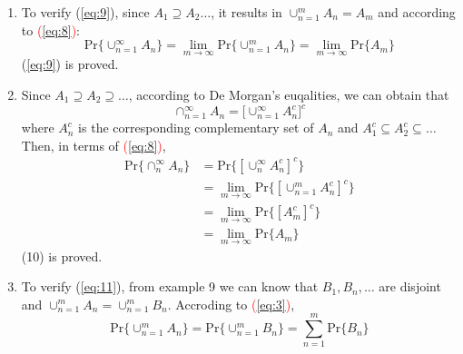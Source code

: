 \documentclass[UTF8]{article}
\begin{document}
\begin{enumerate}[1.]
        Then, since $B_1,B_2,\dots$ are disjoint, according to \textcolor{red}{(\ref{eq:1})} and \textcolor{red}{(\ref{eq:3})}
        \begin{equation*}
            \text{Pr}\{\cup^\infty_{n=1}A_n\}=\text{Pr}\{\cup^\infty_{n=1}B_n\}=\lim_{m\rightarrow\infty}\sum^m_{n=1}\text{Pr}\{B_n\}=\lim_{m\rightarrow\infty}\text{Pr}\{\cup^m_{n=1}B_n\}=\lim_{m\rightarrow\infty}\text{Pr}\{\cup^m_{n=1}A_n\}
        \end{equation*}
        (\ref{eq:8}) is proved
        \item To verify (\ref{eq:9}), since $A_1\supseteq A_2\dots$, it results in $\cup^m_{n=1}A_n=A_m$ and according to \textcolor{red}{(\ref{eq:8})}:
        \begin{equation*}
            \text{Pr}\big\{\cup^\infty_{n=1}A_n\big\}=\lim_{m\rightarrow\infty}\text{Pr}\{\cup^m_{n=1}A_n\}=\lim_{m\rightarrow\infty}\text{Pr}\{A_m\}
        \end{equation*}
        (\ref{eq:9}) is proved.
        \item Since $A_1\supseteq A_2\supseteq\dots$, according to De Morgan's euqalities, we can obtain that 
        \begin{equation*}
            \cap^\infty_{n=1}A_n=\big[\cup^\infty_{n=1}A_n^c\big]^c
        \end{equation*}
        where $A^c_n$ is the corresponding complementary set of $A_n$ and $A^c_1\subseteq A^c_2\subseteq\dots$ Then, in terms of \textcolor{red}{(\ref{eq:8})},
        \begin{equation*}
            \begin{aligned}
                \text{Pr}\{\cap^\infty_nA_n\}&=\text{Pr}\{[\cup^\infty_nA^c_n]^c\}\\
                &=\lim_{m\rightarrow\infty}\text{Pr}\{[\cup^m_{n=1}A_n^c]^c\}\\
                &=\lim_{m\rightarrow\infty}\text{Pr}\{[A^c_m]^c\}\\
                &=\lim_{m\rightarrow\infty}\text{Pr}\{A_m\}
            \end{aligned}         
        \end{equation*}
        (10) is proved.
        \item To verify (\ref{eq:11}), from example 9 we can know that $B_1,B_n,\dots$ are disjoint and $\cup^m_{n=1}A_n=\cup^m_{n=1}B_n$. Accroding to \textcolor{red}{(\ref{eq:3})},
        \begin{equation*}
            \text{Pr}\{\cup^m_{n=1}A_n\}=\text{Pr}\{\cup^m_{n=1}B_n\}=\sum^m_{n=1}\text{Pr}\{B_n\}

\end{equation*}
\end{enumerate}
\end{document}
